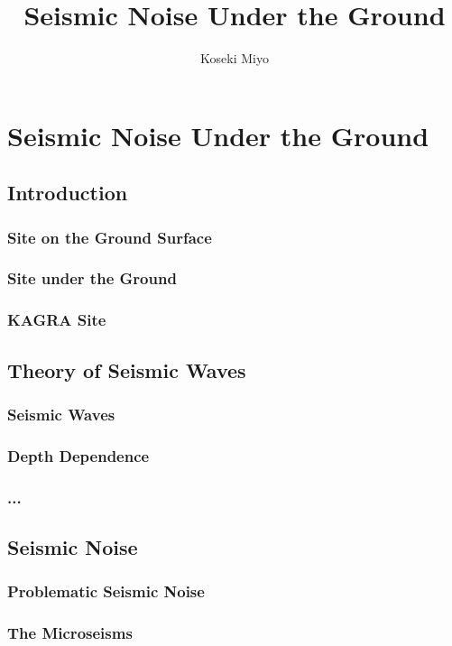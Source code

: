 \documentclass[a4paper,12pt]{book}
\title{Seismic Noise Under the Ground}
\author{Koseki Miyo}
\begin{document}
\setcounter{tocdepth}{2}
\maketitle

\tableofcontents

\chapter{Seismic Noise Under the Ground}
\section{Introduction}
\subsection{Site on the Ground Surface}
\subsection{Site under the Ground}
\subsection{KAGRA Site}
\section{Theory of Seismic Waves}
\subsection{Seismic Waves}
\subsection{Depth Dependence}
\subsection{...}
\section{Seismic Noise}
\subsection{Problematic Seismic Noise}
\subsection{The Microseisms}
\end{document}
